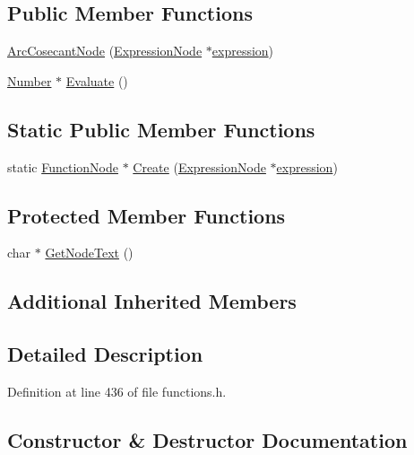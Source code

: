 \subsection*{Public Member Functions}
\begin{DoxyCompactItemize}
\item 
\hyperlink{classArcCosecantNode_a0a06f57986491b3a1a4f952688bc4036}{Arc\+Cosecant\+Node} (\hyperlink{classExpressionNode}{Expression\+Node} $\ast$\hyperlink{classFunctionNode_ad7577b179a1937aaf8a0058bb5b546dc}{expression})
\item 
\hyperlink{structNumber}{Number} $\ast$ \hyperlink{classArcCosecantNode_a4cb42e104cb77fd303bb57c73d8286b0}{Evaluate} ()
\end{DoxyCompactItemize}
\subsection*{Static Public Member Functions}
\begin{DoxyCompactItemize}
\item 
static \hyperlink{classFunctionNode}{Function\+Node} $\ast$ \hyperlink{classArcCosecantNode_a03cc6abd00b92a4a8d7e801fc0d063bb}{Create} (\hyperlink{classExpressionNode}{Expression\+Node} $\ast$\hyperlink{classFunctionNode_ad7577b179a1937aaf8a0058bb5b546dc}{expression})
\end{DoxyCompactItemize}
\subsection*{Protected Member Functions}
\begin{DoxyCompactItemize}
\item 
char $\ast$ \hyperlink{classArcCosecantNode_ad0cc72410c2754f5befec12cac5e7f01}{Get\+Node\+Text} ()
\end{DoxyCompactItemize}
\subsection*{Additional Inherited Members}


\subsection{Detailed Description}


Definition at line 436 of file functions.\+h.



\subsection{Constructor \& Destructor Documentation}
